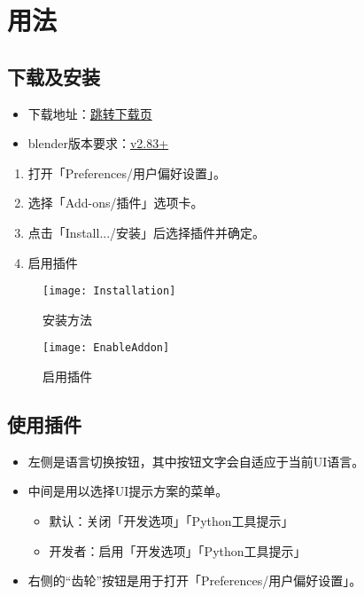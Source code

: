 \documentclass{../../PublicResources/DocClass}
\begin{document}
    \section{用法}

    \subsection{下载及安装}
    \begin{itemize}
        \item 下载地址：\href{https://github.com/Mister-Kin/ToggleLanguage/releases/latest}{跳转下载页}
        \item blender版本要求：\href{https://www.blender.org/download/}{v2.83+}
    \end{itemize}

    \begin{enumerate}
        \item 打开「Preferences/用户偏好设置」。
        \item 选择「Add-ons/插件」选项卡。
        \item 点击「Install.../安装」后选择插件并确定。
        \item 启用插件
    \end{enumerate}

    \begin{figure}[htbp]
        \begin{minipage}[t]{0.45\textwidth}
            \texttt{[image: Installation]}
            \caption*{安装方法}
        \end{minipage}
        \qquad
        \begin{minipage}[t]{0.45\textwidth}
            \texttt{[image: EnableAddon]}
            \caption*{启用插件}
        \end{minipage}
    \end{figure}

    \subsection{使用插件}
    \begin{itemize}
        \item 左侧是语言切换按钮，其中按钮文字会自适应于当前UI语言。
        \item 中间是用以选择UI提示方案的菜单。
        \begin{itemize}
            \item 默认：关闭「开发选项」「Python工具提示」
            \item 开发者：启用「开发选项」「Python工具提示」
        \end{itemize}
        \item 右侧的“齿轮”按钮是用于打开「Preferences/用户偏好设置」。
    \end{itemize}
\end{document}
